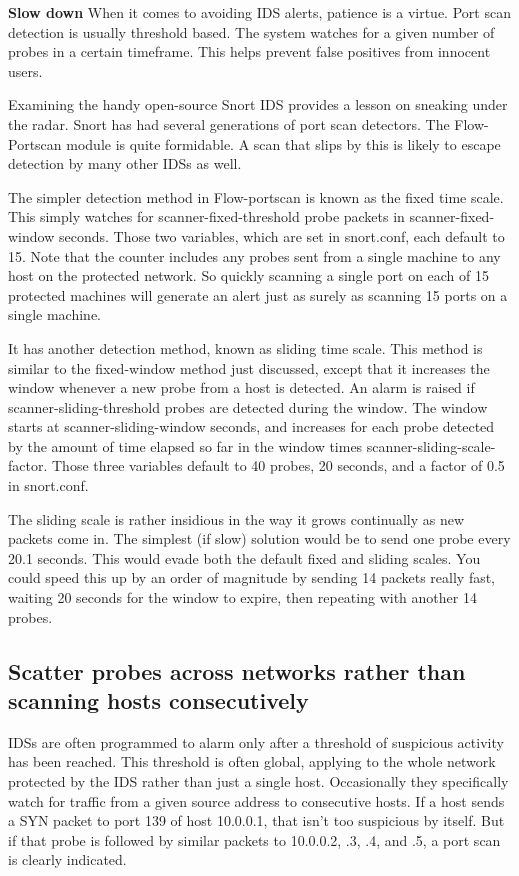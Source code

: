 \textbf{Slow down}
When it comes to avoiding IDS alerts, patience is a virtue. Port scan detection is usually threshold based. 
The system watches for a given number of probes in a certain timeframe. 
This helps prevent false positives from innocent users.

Examining the handy open-source Snort IDS provides a lesson on sneaking under the radar. 
Snort has had several generations of port scan detectors. 
The Flow-Portscan module is quite formidable. 
A scan that slips by this is likely to escape detection by many other IDSs as well.

The simpler detection method in Flow-portscan is known as the fixed time scale. 
This simply watches for scanner-fixed-threshold probe packets in scanner-fixed-window seconds. 
Those two variables, which are set in snort.conf, each default to 15. Note that the counter includes any probes sent 
from a single machine to any host on the protected network. So quickly scanning a single port on each of 15 protected 
machines will generate an alert just as surely as scanning 15 ports on a single machine.

It has another detection method, known as sliding time scale. 
This method is similar to the fixed-window method just discussed, except that it increases the window whenever a new probe from a 
host is detected. An alarm is raised if scanner-sliding-threshold probes are detected during the window. The window starts at 
scanner-sliding-window seconds, and increases for each probe detected by the amount of time elapsed so far in the window times 
scanner-sliding-scale-factor. 
Those three variables default to 40 probes, 20 seconds, and a factor of 0.5 in snort.conf.

The sliding scale is rather insidious in the way it grows continually as new packets come in. 
The simplest (if slow) solution would be to send one probe every 20.1 seconds. 
This would evade both the default fixed and sliding scales.
You could speed this up by an order of magnitude by sending 14 packets really fast, waiting 20 seconds for the window to expire, 
then repeating with another 14 probes.

\subsection{Scatter probes across networks rather than scanning hosts consecutively}
IDSs are often programmed to alarm only after a threshold of suspicious activity has been reached. 
This threshold is often global, applying to the whole network protected by the IDS rather than just a single host. 
Occasionally they specifically watch for traffic from a given source address to consecutive hosts. 
If a host sends a SYN packet to port 139 of host 10.0.0.1, that isn't too suspicious by itself. 
But if that probe is followed by similar packets to 10.0.0.2, .3, .4, and .5, a port scan is clearly indicated.

